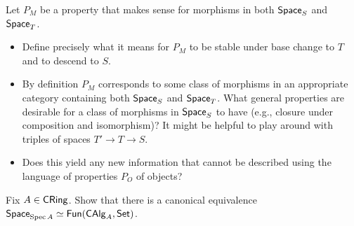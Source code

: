 \documentclass[11pt]{article}
\begin{document}
\begin{exercise}
Let $P_M$ be a property that makes sense for morphisms in both $\operatorname{\mathsf{Space}}_S$ and $\operatorname{\mathsf{Space}}_T$. 
\begin{itemize}
\item Define precisely what it means for $P_M$ to be stable under base change to $T$ and to descend to $S$.

\item By definition $P_M$ corresponds to some class of morphisms in an appropriate category containing both $\operatorname{\mathsf{Space}}_S$ and $\operatorname{\mathsf{Space}}_T$. What general properties are desirable for a class of morphisms in $\operatorname{\mathsf{Space}}_S$ to have (e.g., closure under composition and isomorphism)? It might be helpful to play around with triples of spaces $T'\to T\to S$. 

\item Does this yield any new information that cannot be described using the language of properties $P_O$ of objects?
\end{itemize}
\end{exercise}

\begin{exercise}
Fix $A\in\operatorname{\mathsf{CRing}}$. Show that there is a canonical equivalence $\operatorname{\mathsf{Space}}_{\operatorname{Spec} A}\simeq\operatorname{\mathsf{Fun}}(\operatorname{\mathsf{CAlg}}_A,\operatorname{\mathsf{Set}})$.
\end{exercise}
\end{document}
